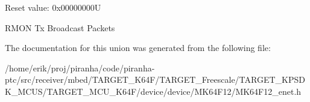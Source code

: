Reset value\+: 0x00000000U

R\+M\+ON Tx Broadcast Packets 

The documentation for this union was generated from the following file\+:\begin{DoxyCompactItemize}
\item 
/home/erik/proj/piranha/code/piranha-\/ptc/src/receiver/mbed/\+T\+A\+R\+G\+E\+T\+\_\+\+K64\+F/\+T\+A\+R\+G\+E\+T\+\_\+\+Freescale/\+T\+A\+R\+G\+E\+T\+\_\+\+K\+P\+S\+D\+K\+\_\+\+M\+C\+U\+S/\+T\+A\+R\+G\+E\+T\+\_\+\+M\+C\+U\+\_\+\+K64\+F/device/device/\+M\+K64\+F12/M\+K64\+F12\+\_\+enet.\+h\end{DoxyCompactItemize}
